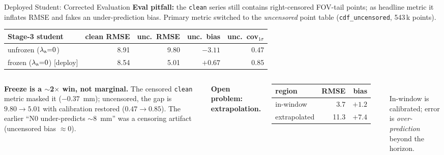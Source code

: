 \documentclass[UTF8,aspectratio=169]{ctexbeamer}
\newcommand{\good}[1]{\textcolor{green!45!black}{#1}}
\newcommand{\warn}[1]{\textcolor{red!65!black}{#1}}
\begin{document}
\begin{frame}{Deployed Student: Corrected Evaluation}
\footnotesize
\textbf{Eval pitfall:} the \texttt{clean} series still contains right-censored
FOV-tail points; as headline metric it inflates RMSE and fakes an under-prediction
bias. Primary metric switched to the \emph{uncensored} point table
(\texttt{cdf\_uncensored}, 543\,k points).

\smallskip
\begin{center}
\renewcommand{\arraystretch}{1.1}
\setlength{\tabcolsep}{5pt}
\begin{tabular}{@{}lrrrr@{}}
\toprule
\textbf{Stage-3 student} & \textbf{clean RMSE} & \textbf{unc.\ RMSE} & \textbf{unc.\ bias} & \textbf{unc.\ cov$_{1\sigma}$} \\
\midrule
unfrozen ($\lambda_{\rm a}{=}0$)         & 8.91 & \warn{9.80} & \warn{$-3.11$} & \warn{0.47} \\
\rowcolor{winrow}
frozen ($\lambda_{\rm a}{=}0$) [deploy]  & 8.54 & \good{5.01} & \good{$+0.67$} & \good{0.85} \\
\bottomrule
\end{tabular}
\end{center}

\begin{columns}[T]
\textbf{Freeze is a $\sim$2$\times$ win, not marginal.} The censored \texttt{clean}
metric masked it ($-0.37$~mm); uncensored, the gap is $9.80\!\to\!5.01$ with
calibration restored ($0.47\!\to\!0.85$). The earlier ``N0 under-predicts
$\sim$8~mm'' was a censoring artifact (uncensored bias $\approx 0$).

\textbf{Open problem: extrapolation.}\\[2pt]
\begin{tabular}{@{}lrr@{}}
\toprule
region & RMSE & bias \\
\midrule
in-window     & \good{3.7}  & $+1.2$ \\
extrapolated  & \warn{11.3} & \warn{$+7.4$} \\
\bottomrule
\end{tabular}\\[2pt]
In-window is calibrated; error is \emph{over-prediction} beyond the horizon.
\end{columns}
\end{frame}
\end{document}

